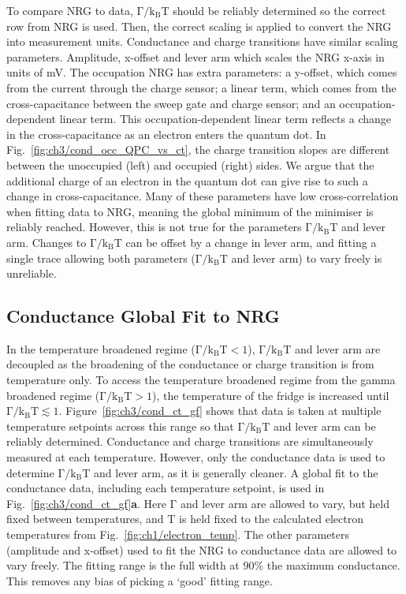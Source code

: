 To compare NRG to data, $\mathrm{\Gamma/k_BT}$ should be reliably determined so the correct row from NRG is used. Then, the correct scaling is applied to convert the NRG into measurement units. Conductance and charge transitions have similar scaling parameters. Amplitude, x-offset and lever arm which scales the NRG x-axis in units of mV. The occupation NRG has extra parameters: a y-offset, which comes from the current through the charge sensor; a linear term, which comes from the cross-capacitance between the sweep gate and charge sensor; and an occupation-dependent linear term. 
This occupation-dependent linear term reflects a change in the cross-capacitance as an electron enters the quantum dot. In Fig.~\ref{fig:ch3/cond_occ_QPC_vs_ct}, the charge transition slopes are different between the unoccupied (left) and occupied (right) sides. We argue that the additional charge of an electron in the quantum dot can give rise to such a change in cross-capacitance. Many of these parameters have low cross-correlation when fitting data to NRG, meaning the global minimum of the minimiser is reliably reached. However, this is not true for the parameters $\mathrm{\Gamma/k_BT}$ and lever arm. Changes to $\mathrm{\Gamma/k_BT}$ can be offset by a change in lever arm, and fitting a single trace allowing both parameters ($\mathrm{\Gamma/k_BT}$ and lever arm) to vary freely is unreliable. 


\subsection{Conductance Global Fit to NRG}
In the temperature broadened regime ($\mathrm{\Gamma/k_BT} < 1$), $\mathrm{\Gamma/k_BT}$ and lever arm are decoupled as the broadening of the conductance or charge transition is from temperature only. To access the temperature broadened regime from the gamma broadened regime ($\mathrm{\Gamma/k_BT} > 1$), the temperature of the fridge is increased until $\mathrm{\Gamma/k_BT} \lesssim 1$. Figure~\ref{fig:ch3/cond_ct_gf} shows that data is taken at multiple temperature setpoints across this range so that $\mathrm{\Gamma/k_BT}$ and lever arm can be reliably determined. Conductance and charge transitions are simultaneously measured at each temperature. However, only the conductance data is used to determine $\mathrm{\Gamma/k_BT}$ and lever arm, as it is generally cleaner. A global fit to the conductance data, including each temperature setpoint, is used in Fig.~\ref{fig:ch3/cond_ct_gf}\textbf{a}. Here $\mathrm{\Gamma}$ and lever arm are allowed to vary, but held fixed between temperatures, and $\mathrm{T}$ is held fixed to the calculated electron temperatures from Fig.~\ref{fig:ch1/electron_temp}. The other parameters (amplitude and x-offset) used to fit the NRG to conductance data are allowed to vary freely.
The fitting range is the full width at $90\%$ the maximum conductance. This removes any bias of picking a `good' fitting range. 

